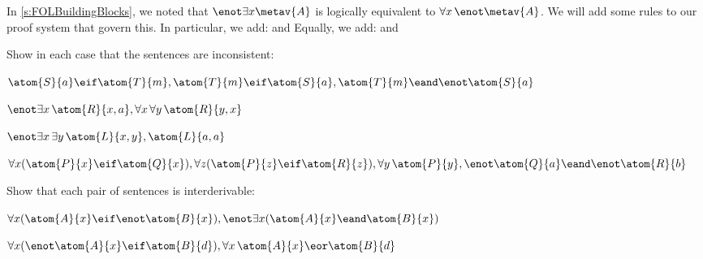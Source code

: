 In \cref{s:FOLBuildingBlocks}, we noted that $\enot\exists x\metav{A}$ is logically equivalent to $\forall x\, \enot\metav{A}$. We will add some rules to our proof system that govern this. In particular, we add:
and
Equally, we add:
and

\practiceproblems
\problempart
Show in each case that the sentences are inconsistent:
\begin{compactlist}
\item $\atom{S}{a}\eif \atom{T}{m}, \atom{T}{m} \eif \atom{S}{a}, \atom{T}{m} \eand \enot \atom{S}{a}$
\item $\enot\exists x\,\atom{R}{x,a}, \forall x\, \forall y\,\atom{R}{y,x}$
\item $\enot\exists x\, \exists y\,\atom{L}{x,y}, \atom{L}{a,a}$
\item $\forall x(\atom{P}{x} \eif \atom{Q}{x}), \forall z(\atom{P}{z} \eif \atom{R}{z}), \forall y\,\atom{P}{y}, \enot \atom{Q}{a} \eand \enot \atom{R}{b}$
\end{compactlist}

\problempart
Show that each pair of sentences is interderivable:
\begin{compactlist}
\item $\forall x (\atom{A}{x}\eif \enot \atom{B}{x}), \enot\exists x(\atom{A}{x} \eand \atom{B}{x})$
\item $\forall x (\enot\atom{A}{x}\eif \atom{B}{d}), \forall x\,\atom{A}{x} \eor \atom{B}{d}$
\end{compactlist}

